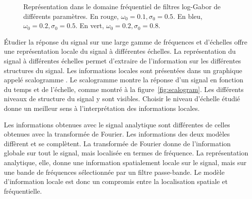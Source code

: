 \begin{figure}
    \centering

    \caption[Filtres log-Gabor]{Représentation dans le domaine fréquentiel de filtres log-Gabor de différents paramètres. En rouge, $\omega_0=0.1, \sigma_0 = 0.5$. En bleu, $\omega_0=0.2, \sigma_0 = 0.5$. En vert, $\omega_0=0.2, \sigma_0 = 0.8$.}
    \label{fig:log-gabor-filters}
\end{figure}

Étudier la réponse du signal sur une large gamme de fréquences et d'échelles offre une représentation locale du signal à différentes échelles. La représentation du signal à différentes échelles permet d'extraire de l'information sur les différentes structures du signal. Les informations locales sont présentées dans un graphique appelé \og scalogramme \fg. Le scalogramme montre la réponse d'un signal en fonction du temps et de l'échelle, comme montré à la figure~\ref{fig:scalogram}. Les différents niveaux de structure du signal y sont visibles. Choisir le niveau d'échelle étudié donne un meilleur sens à l'interprétation des informations locales.

\bigskip

Les informations obtenues avec le signal analytique sont différentes de celles obtenues avec la transformée de Fourier. Les informations des deux modèles diffèrent et se complètent. La transformée de Fourier donne de l'information globale sur tout le signal, mais localisée en termes de fréquence. La représentation analytique, elle, donne une information spatialement locale sur le signal, mais sur une bande de fréquences sélectionnée par un filtre passe-bande. Le modèle d'information locale est donc un compromis entre la localisation spatiale et fréquentielle.


